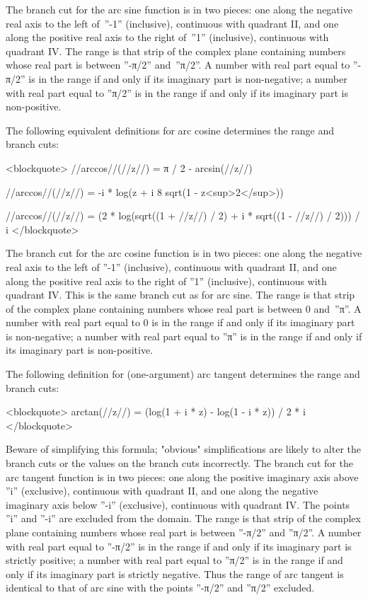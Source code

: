 The branch cut for the arc sine function is in two pieces: one along the negative real axis to the left of~''-1'' (inclusive), continuous with quadrant II, and one along the positive real axis to the right of~''1'' (inclusive), continuous with quadrant IV. The range is that strip of the complex plane containing numbers whose real part is between ''-π/2'' and~''π/2''. A number with real part equal to ''-π/2'' is in the range if and only if its imaginary part is non-negative; a number with real part equal to ''π/2'' is in the range if and only if its imaginary part is non-positive.

The following equivalent definitions for arc cosine determines the range and branch cuts:

<blockquote>
//arccos//(//z//) = π / 2 - arcsin(//z//)

//arccos//(//z//) = -i * log(z + i 8 sqrt(1 - z<sup>2</sup>))

//arccos//(//z//) = (2 * log(sqrt((1 + //z//) / 2) + i * sqrt((1 - //z//) / 2))) / i
</blockquote>

The branch cut for the arc cosine function is in two pieces: one along the negative real axis to the left of ''-1'' (inclusive), continuous with quadrant II, and one along the positive real axis to the right of ''1'' (inclusive), continuous with quadrant IV. This is the same branch cut as for arc sine. The range is that strip of the complex plane containing numbers whose real part is between 0 and~''π''. A number with real part equal to 0 is in the range if and only if its imaginary part is non-negative; a number with real part equal to ''π'' is in the range if and only if its imaginary part is non-positive.

The following definition for (one-argument) arc tangent determines the range and branch cuts:

<blockquote>
arctan(//z//) = (log(1 + i * z) - log(1 - i * z)) / 2 * i
</blockquote>

Beware of simplifying this formula; "obvious" simplifications are likely to alter the branch cuts or the values on the branch cuts incorrectly. The branch cut for the arc tangent function is in two pieces: one along the positive imaginary axis above ''i'' (exclusive), continuous with quadrant II, and one along the negative imaginary axis below ''-i'' (exclusive), continuous with quadrant IV. The points ''i'' and ''-i'' are excluded from the domain. The range is that strip of the complex plane containing numbers whose real part is between ''-π/2'' and ''π/2''. A number with real part equal to ''-π/2'' is in the range if and only if its imaginary part is strictly positive; a number with real part equal to ''π/2'' is in the range if and only if its imaginary part is strictly negative. Thus the range of arc tangent is identical to that of arc sine with the points ''-π/2'' and ''π/2'' excluded.

